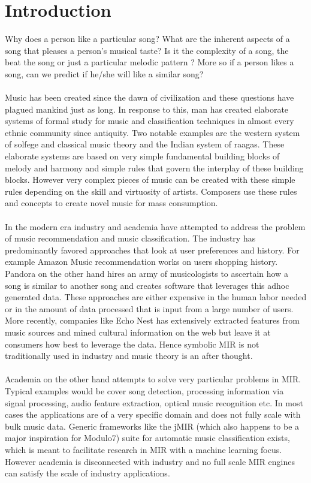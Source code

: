 \chapter{Introduction}
\label{sec:intro}

\noindent Why does a person like a particular song? What are the inherent aspects of a song that pleases a person's musical taste? Is it the complexity of a song, the beat the song or just a particular melodic pattern ? More so if a person likes a song, can we predict if he/she will like a similar song? \\\\
Music has been created since the dawn of civilization and these questions have plagued mankind just as long. In response to this, man has created elaborate systems of formal study for music and classification techniques in almost every ethnic community since antiquity. Two notable examples are the western system of solfege and classical music theory and the Indian system of raagas. These elaborate systems are based on very simple fundamental building blocks of melody and harmony and simple rules that govern the interplay of these building blocks. However very complex pieces of music can be created with these simple rules depending on the skill and virtuosity of artists. Composers use these rules and concepts to create novel music for mass consumption. \\\\
In the modern era industry and academia have attempted to address the problem of music recommendation and music classification. The industry has predominantly favored approaches that look at user preferences and history. For example Amazon Music recommendation works on users shopping history. Pandora on the other hand hires an army of musicologists to ascertain how a song is similar to another song and creates software that leverages this adhoc generated data. These approaches are either expensive in the human labor needed or in the amount of data processed that is input from a large number of users. More recently, companies like Echo Nest has extensively extracted features from music sources and mined cultural information on the web but leave it at consumers how best to leverage the data. Hence symbolic MIR is not traditionally used in industry and music theory is an after thought. \\\\
Academia on the other hand attempts to solve very particular problems in MIR. Typical examples would be cover song detection, processing information via signal processing, audio feature extraction, optical music recognition etc. In most cases the applications are of a very specific domain and does not fully scale with bulk music data. Generic frameworks like the jMIR \cite{jMIR} (which also happens to be a major inspiration for Modulo7) suite for automatic music classification exists, which is meant to facilitate research in MIR with a machine learning focus. However academia is disconnected with industry and no full scale MIR engines can satisfy the scale of industry applications. \\\\
